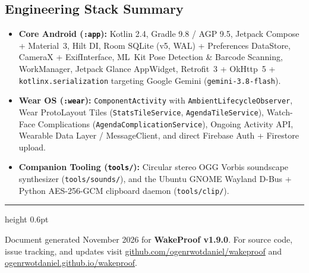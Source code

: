 \documentclass[11pt,a4paper]{article}
\begin{document}
\subsection{Engineering Stack Summary}
\begin{itemize}
  \item \textbf{Core Android (\texttt{:app}):} Kotlin 2.4, Gradle 9.8 / AGP 9.5, Jetpack Compose + Material~3, Hilt DI, Room SQLite (v5, WAL) + Preferences DataStore, CameraX + ExifInterface, ML~Kit Pose Detection \& Barcode Scanning, WorkManager, Jetpack Glance AppWidget, Retrofit~3 + OkHttp~5 + \texttt{kotlinx.serialization} targeting Google Gemini (\texttt{gemini-3.8-flash}).
  \item \textbf{Wear OS (\texttt{:wear}):} \texttt{ComponentActivity} with \texttt{AmbientLifecycle\allowbreak Observer}, Wear ProtoLayout Tiles (\texttt{StatsTile\allowbreak Service}, \texttt{AgendaTile\allowbreak Service}), Watch-Face Complications (\texttt{AgendaComplication\allowbreak Service}), Ongoing Activity API, Wearable Data Layer / MessageClient, and direct Firebase Auth + Firestore upload.
  \item \textbf{Companion Tooling (\texttt{tools/}):} Circular stereo OGG Vorbis soundscape synthesizer (\texttt{tools/sounds/}), and the Ubuntu GNOME Wayland D-Bus + Python AES-256-GCM clipboard daemon (\texttt{tools/clip/}).
\end{itemize}

\vspace{8pt}
{\color{wpborder}\hrule height 0.6pt}
\vspace{4pt}
{\sloppy\sffamily\footnotesize\color{wpmuted}Document generated November 2026 for \textbf{WakeProof v1.9.0}. For source code, issue tracking, and updates visit \href{https://github.com/ogenrwotdaniel/wakeproof}{github.com/ogenrwotdaniel/wakeproof} and \href{https://ogenrwotdaniel.github.io/wakeproof/}{ogenrwotdaniel.github.io/wakeproof}.\par}
\end{document}
